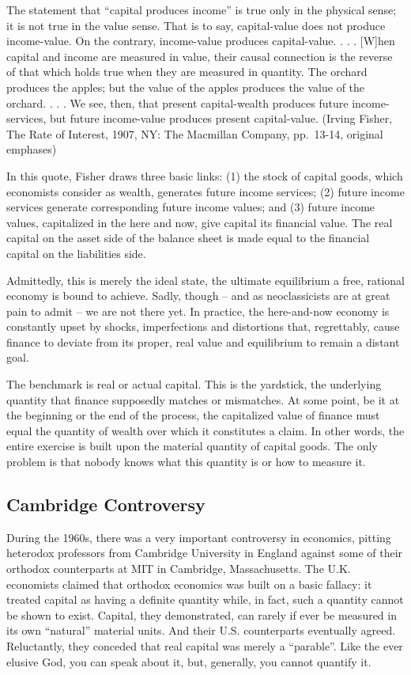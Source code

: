 \documentclass[
]{book}
\begin{document}
The statement that ``capital produces income'' is true only in the physical sense; it is not true in the value sense. That is to say, capital-value does not produce income-value. On the contrary, income-value produces capital-value. . . . {[}W{]}hen capital and income are measured in value, their causal connection is the reverse of that which holds true when they are measured in quantity. The orchard produces the apples; but the value of the apples produces the value of the orchard. . . . We see, then, that present capital-wealth produces future income-services, but future income-value produces present capital-value. (Irving Fisher, The Rate of Interest, 1907, NY: The Macmillan Company, pp.~13-14, original emphases)

In this quote, Fisher draws three basic links:
(1) the stock of capital goods, which economists consider as wealth, generates future income services;
(2) future income services generate corresponding future income values; and
(3) future income values, capitalized in the here and now, give capital its financial value.
The real capital on the asset side of the balance sheet is made equal to the financial capital on the liabilities side.

Admittedly, this is merely the ideal state, the ultimate equilibrium a free, rational economy is bound to achieve. Sadly, though -- and as neoclassicists are at great pain to admit -- we are not there yet. In practice, the here-and-now economy is constantly upset by shocks, imperfections and distortions that, regrettably, cause finance to deviate from its proper, real value and equilibrium to remain a distant goal.

The benchmark is real or actual capital. This is the yardstick, the underlying quantity that finance supposedly matches or mismatches. At some point, be it at the beginning or the end of the process, the capitalized value of finance must equal the quantity of wealth over which it constitutes a claim. In other words, the entire exercise is built upon the material quantity of capital goods. The only problem is that nobody knows what this quantity is or how to measure it.

\hypertarget{cambridge-controversy}{%
\subsection{Cambridge Controversy}\label{cambridge-controversy}}

During the 1960s, there was a very important controversy in economics, pitting heterodox professors from Cambridge University in England against some of their orthodox counterparts at MIT in Cambridge, Massachusetts. The U.K. economists claimed that orthodox economics was built on a basic fallacy: it treated capital as having a definite quantity while, in fact, such a quantity cannot be shown to exist. Capital, they demonstrated, can rarely if ever be measured in its own ``natural'' material units. And their U.S. counterparts eventually agreed. Reluctantly, they conceded that real capital was merely a ``parable''. Like the ever elusive God, you can speak about it, but, generally, you cannot quantify it.
\end{document}
